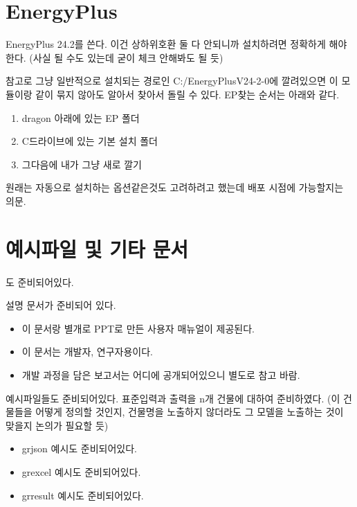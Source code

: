 \section{EnergyPlus}
EnergyPlus 24.2를 쓴다. 이건 상하위호환 둘 다 안되니까 설치하려면 정확하게 해야 한다. (사실 될 수도 있는데 굳이 체크 안해봐도 될 듯)\par
참고로 그냥 일반적으로 설치되는 경로인 C:/EnergyPlusV24-2-0에 깔려있으면 이 모듈이랑 같이 묶지 않아도 알아서 찾아서 돌릴 수 있다. EP찾는 순서는 아래와 같다.

\begin{enumerate}
  \item dragon 아래에 있는 EP 폴더
  \item C드라이브에 있는 기본 설치 폴더
  \item 그다음에 내가 그냥 새로 깔기
\end{enumerate}

원래는 자동으로 설치하는 옵션같은것도 고려하려고 했는데 배포 시점에 가능할지는 의문.


\section{예시파일 및 기타 문서}
도 준비되어있다.

설명 문서가 준비되어 있다.
\begin{itemize}
  \item 이 문서랑 별개로 PPT로 만든 사용자 매뉴얼이 제공된다.
  \item 이 문서는 개발자, 연구자용이다.
  \item 개발 과정을 담은 보고서는 어디에 공개되어있으니 별도로 참고 바람.
\end{itemize}

예시파일들도 준비되어있다. 표준입력과 출력을 n개 건물에 대하여 준비하였다.
(이 건물들을 어떻게 정의할 것인지, 건물명을 노출하지 않더라도 그 모델을 노출하는 것이 맞을지 논의가 필요할 듯)

\begin{itemize}
  \item grjson 예시도 준비되어있다.
  \item grexcel 예시도 준비되어있다.
  \item grresult 예시도 준비되어있다.
\end{itemize}


